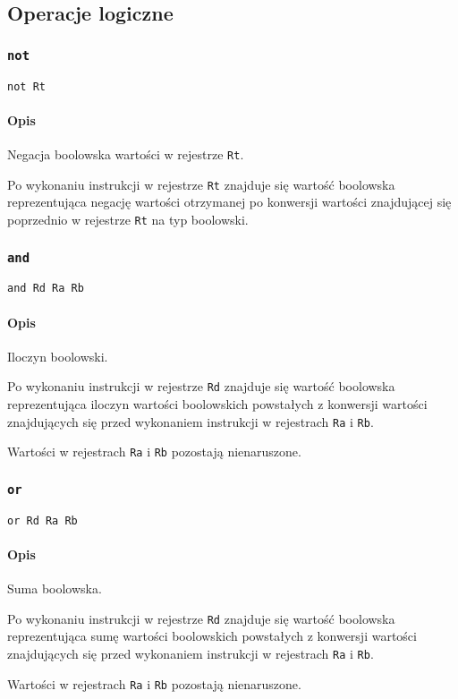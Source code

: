 \subsection{Operacje logiczne}
\label{viua_vm_ops_boolean_logic}

\subsubsection{\texttt{not}}

\begin{lstlisting}
not Rt
\end{lstlisting}

\paragraph*{Opis} Negacja boolowska wartości w rejestrze \texttt{Rt}.

Po wykonaniu instrukcji w rejestrze \texttt{Rt} znajduje się wartość boolowska
reprezentująca negację wartości otrzymanej po konwersji wartości znajdującej się
poprzednio w rejestrze \texttt{Rt} na typ boolowski.

\subsubsection{\texttt{and}}

\begin{lstlisting}
and Rd Ra Rb
\end{lstlisting}

\paragraph*{Opis} Iloczyn boolowski.

Po wykonaniu instrukcji w rejestrze \texttt{Rd} znajduje się wartość boolowska
reprezentująca iloczyn wartości boolowskich powstałych z konwersji wartości
znajdujących się przed wykonaniem instrukcji w rejestrach \texttt{Ra} i
\texttt{Rb}.

Wartości w rejestrach \texttt{Ra} i \texttt{Rb} pozostają nienaruszone.

\subsubsection{\texttt{or}}

\begin{lstlisting}
or Rd Ra Rb
\end{lstlisting}

\paragraph*{Opis} Suma boolowska.

Po wykonaniu instrukcji w rejestrze \texttt{Rd} znajduje się wartość boolowska
reprezentująca sumę wartości boolowskich powstałych z konwersji wartości
znajdujących się przed wykonaniem instrukcji w rejestrach \texttt{Ra} i
\texttt{Rb}.

Wartości w rejestrach \texttt{Ra} i \texttt{Rb} pozostają nienaruszone.
